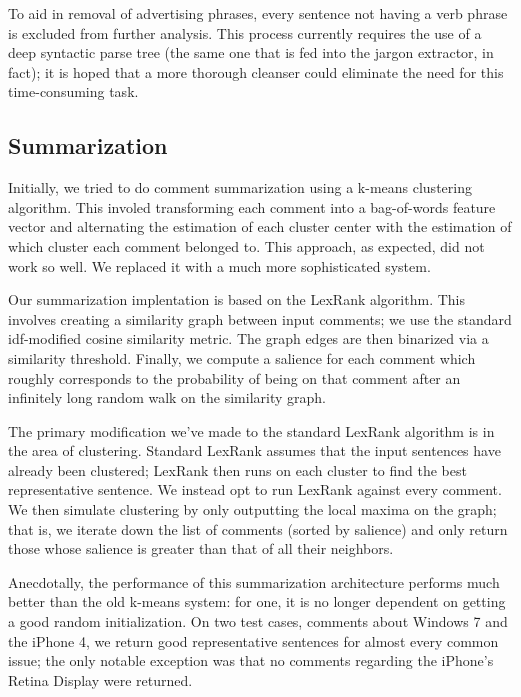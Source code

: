 \documentclass{article}
\begin{document}
To aid in removal of advertising phrases, every sentence not having a verb
phrase is excluded from further analysis. This process currently requires the
use of a deep syntactic parse tree (the same one that is fed into the jargon
extractor, in fact); it is hoped that a more thorough cleanser could eliminate
the need for this time-consuming task.



\subsection{Summarization} %

Initially, we tried to do comment summarization using a k-means clustering
algorithm. This involed transforming each comment into a bag-of-words feature
vector and alternating the estimation of each cluster center with the
estimation of which cluster each comment belonged to. This approach, as
expected, did not work so well. We replaced it with a much more sophisticated
system.

Our summarization implentation is based on the LexRank algorithm.
This involves creating a similarity graph between input comments;
we use the standard idf-modified cosine similarity metric. The
graph edges are then binarized via a similarity threshold. Finally,
we compute a salience for each comment which roughly corresponds
to the probability of being on that comment after an infinitely
long random walk on the similarity graph.

The primary modification we've made to the standard LexRank
algorithm is in the area of clustering. Standard LexRank assumes
that the input sentences have already been clustered; LexRank then
runs on each cluster to find the best representative sentence. We
instead opt to run LexRank against every comment. We then simulate
clustering by only outputting the local maxima on the graph; that
is, we iterate down the list of comments (sorted by salience) and
only return those whose salience is greater than that of all their
neighbors.

Anecdotally, the performance of this summarization architecture
performs much better than the old k-means system: for one, it is no
longer dependent on getting a good random initialization. On two
test cases, comments about Windows 7 and the iPhone 4, we return
good representative sentences for almost every common issue; the
only notable exception was that no comments regarding the iPhone's
Retina Display were returned.
\end{document}
